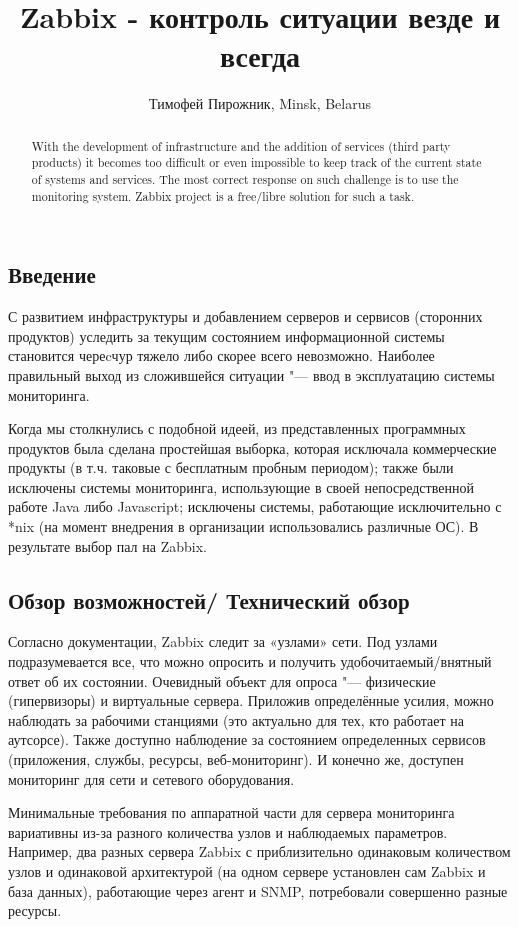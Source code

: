 \documentclass[10pt, a5paper]{article}
\begin{document}
\title{Zabbix - контроль ситуации везде и всегда}
\author{Тимофей Пирожник, Minsk, Belarus}
\maketitle
\begin{abstract}
With the development of infrastructure and the addition of services (third party products) it becomes too difficult or even impossible to keep track of the current state of systems and services. The most correct response on such challenge is to use the monitoring system. Zabbix project is a free/libre solution for such a task.
\end{abstract}
\subsection*{Введение}

С развитием инфраструктуры и добавлением серверов и сервисов (сторонних продуктов) уследить за текущим состоянием  информационной системы становится череcчур тяжело либо скорее всего невозможно. Наиболее правильный выход из сложившейся ситуации "--- ввод в эксплуатацию системы мониторинга.

Когда мы столкнулись с подобной идеей, из представленных программных продуктов была сделана простейшая выборка, которая исключала коммерческие продукты (в т.ч. таковые с бесплатным пробным периодом); также были исключены системы мониторинга, использующие в своей непосредственной работе Java либо Javascript; исключены системы, работающие исключительно с *nix (на момент внедрения в организации использовались различные ОС). В результате выбор пал на Zabbix.

\subsection*{Обзор возможностей/ Технический обзор}

Согласно документации, Zabbix следит за «узлами» сети. Под  узлами подразумевается все, что можно опросить и получить удобочитаемый/внятный ответ об их состоянии. Очевидный объект для опроса "--- физические (гипервизоры) и виртуальные сервера. Приложив определённые усилия, можно наблюдать за рабочими станциями (это актуально для тех, кто работает на аутсорсе). Также доступно наблюдение за состоянием определенных сервисов (приложения, службы, ресурсы,  веб-мониторинг). И конечно же, доступен мониторинг для сети и сетевого оборудования.

Минимальные требования по аппаратной части для сервера мониторинга вариативны из-за разного количества узлов и наблюдаемых параметров.  Например, два разных сервера Zabbix с приблизительно одинаковым количеством узлов и одинаковой архитектурой (на одном сервере установлен сам Zabbix и база данных), работающие через агент и SNMP, потребовали совершенно разные ресурсы.
\end{document}
